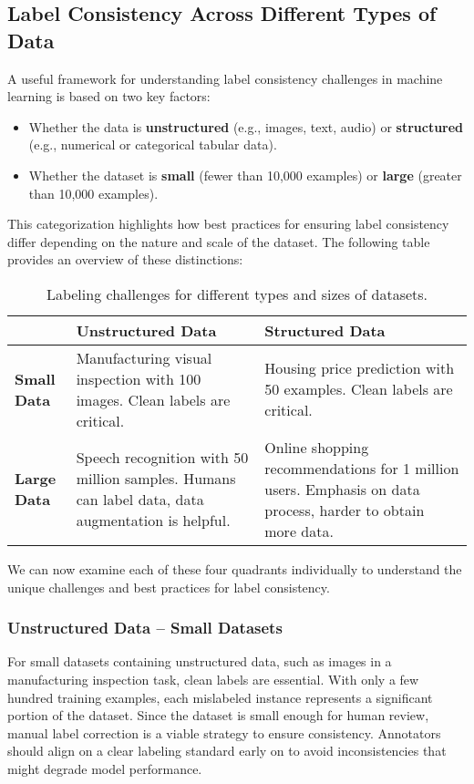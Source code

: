 \documentclass[12pt,openany, draft]{book}
\begin{document}
\subsection{Label Consistency Across Different Types of Data}

A useful framework for understanding label consistency challenges in machine learning is based on two key factors:
\begin{itemize}
    \item Whether the data is \textbf{unstructured} (e.g., images, text, audio) or \textbf{structured} (e.g., numerical or categorical tabular data).
    \item Whether the dataset is \textbf{small} (fewer than 10,000 examples) or \textbf{large} (greater than 10,000 examples).
\end{itemize}

This categorization highlights how best practices for ensuring label consistency differ depending on the nature and scale of the dataset. The following table provides an overview of these distinctions:

\begin{table}[H]
    \centering
    \renewcommand{\arraystretch}{1.5}
    \begin{tabular}{|p{3.5cm}|p{5.5cm}|p{5.5cm}|}
        \hline
        \textbf{} & \textbf{Unstructured Data} & \textbf{Structured Data} \\
        \hline
        \textbf{Small Data} & Manufacturing visual inspection with 100 images. Clean labels are critical.  & Housing price prediction with 50 examples. Clean labels are critical. \\
        \hline
        \textbf{Large Data} & Speech recognition with 50 million samples. Humans can label data, data augmentation is helpful. & Online shopping recommendations for 1 million users. Emphasis on data process, harder to obtain more data. \\
        \hline
    \end{tabular}
    \caption{Labeling challenges for different types and sizes of datasets.}
    \label{tab:label_consistency_framework}
\end{table}

We can now examine each of these four quadrants individually to understand the unique challenges and best practices for label consistency.

\subsubsection{Unstructured Data – Small Datasets}
For small datasets containing unstructured data, such as images in a manufacturing inspection task, clean labels are essential. With only a few hundred training examples, each mislabeled instance represents a significant portion of the dataset. Since the dataset is small enough for human review, manual label correction is a viable strategy to ensure consistency. Annotators should align on a clear labeling standard early on to avoid inconsistencies that might degrade model performance.
\end{document}
